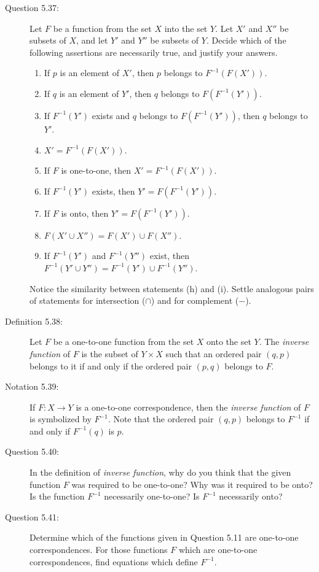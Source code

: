 \documentclass{book}
\begin{document}
\begin{description}
\item[Question 5.37:] Let $F$ be a function from the set $X$ into the set $Y$. Let $X'$ and $X''$ be subsets of $X$, and let $Y'$ and $Y''$ be subsets of $Y$. Decide which of the following assertions are necessarily true, and justify your answers.
\begin{enumerate}[\hspace{1cm}(a)]
  \item If $p$ is an element of $X'$, then $p$ belongs to $F^{-1}(F(X'))$.
  \item If $q$ is an element of $Y'$, then $q$ belongs to $F(F^{-1}(Y'))$.
  \item If $F^{-1}(Y')$ exists and $q$ belongs to $F(F^{-1}(Y'))$, then $q$ belongs to $Y'$.
  \item $X' = F^{-1}(F(X'))$.
  \item If $F$ is one-to-one, then $X' = F^{-1}(F(X'))$.
  \item If $F^{-1}(Y')$ exists, then $Y' = F(F^{-1}(Y'))$.
  \item If $F$ is onto, then $Y' = F(F^{-1}(Y'))$.
  \item $F(X' \cup X'') = F(X') \cup F(X'')$.
  \item If $F^{-1}(Y')$ and $F^{-1}(Y'')$ exist, then $F^{-1}(Y' \cup Y'') = F^{-1}(Y') \cup F^{-1}(Y'')$.
\end{enumerate}
Notice the similarity between statements (h) and (i). Settle analogous pairs of statements for intersection ($\cap$) and for complement ($-$).

\item[Definition 5.38:] Let $F$ be a one-to-one function from the set $X$ onto the set $Y$. The \emph{inverse function} of $F$ is the subset of $Y \times X$ such that an ordered pair $(q,p)$ belongs to it if and only if the ordered pair $(p,q)$ belongs to $F$.

\item[Notation 5.39:] If $F: X \rightarrow Y$ is a one-to-one correspondence, then the \emph{inverse function} of $F$ is symbolized by $F^{-1}$. Note that the ordered pair $(q,p)$ belongs to $F^{-1}$ if and only if $F^{-1}(q)$ is $p$.

\item[Question 5.40:] In the definition of \emph{inverse function}, why do you think that the given function $F$ was required to be one-to-one? Why was it required to be onto? Is the function $F^{-1}$ necessarily one-to-one? Is $F^{-1}$ necessarily onto?

\item[Question 5.41:] Determine which of the functions given in Question 5.11 are one-to-one correspondences. For those functions $F$ which are one-to-one correspondences, find equations which define $F^{-1}$.


\end{description}
\end{document}
